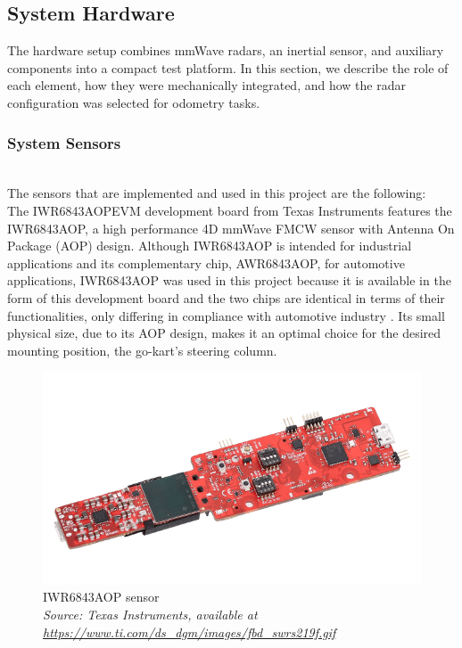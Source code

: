 \subsection{System Hardware}

The hardware setup combines mmWave radars, an inertial sensor, and auxiliary components into a compact test platform.  
In this section, we describe the role of each element, how they were mechanically integrated, and how the radar configuration was selected for odometry tasks.  

\vspace{0.5em}
\subsubsection{System Sensors}
\hfill
\\
The sensors that are implemented and used in this project are the following:
\vspace{0.5em}
\hfill
\\
\indent The IWR6843AOPEVM development board from Texas Instruments features the IWR6843AOP, a high performance 4D mmWave FMCW sensor with Antenna On Package (AOP) design.
Although IWR6843AOP is intended for industrial applications and its complementary chip, AWR6843AOP, for automotive applications, IWR6843AOP was used in this project because it is available in the form of this development board and the two chips are identical in terms of their functionalities, only differing in compliance with automotive  industry \cite{iwr_awr_diff}.
Its small physical size, due to its AOP design, makes it an optimal choice for the desired mounting position, the go-kart's steering column.
\begin{figure}[!htbp]
    \centering
    \includegraphics[width=0.7\linewidth]{images/iwr6843aopevm-angled.png}
    \caption{IWR6843AOP sensor\\
    \textit{Source: Texas Instruments, available at \url{https://www.ti.com/ds_dgm/images/fbd_swrs219f.gif}}}
    \label{fig:IWR6843AOP sensor}
\end{figure}

